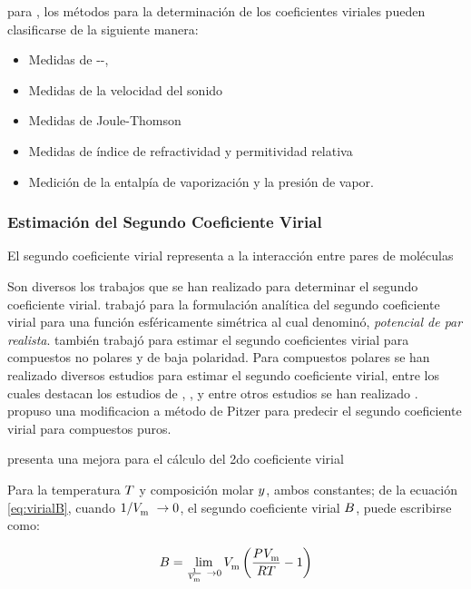     para \parencite{Dymond2002}, los métodos para la determinación de los coeficientes viriales pueden clasificarse de la siguiente manera:

    \begin{itemize}
      \item Medidas de {\pressure{}{}-\Vmolar-\T{}},
      \item Medidas de la velocidad del sonido
      \item Medidas de Joule-Thomson
      \item Medidas de índice de refractividad y permitividad relativa
      \item Medición de la entalpía de vaporización y la presión de vapor. 
    \end{itemize}

\subsubsection{Estimación del Segundo Coeficiente Virial}
  
    El segundo coeficiente virial representa a la interacción entre pares de moléculas

Son diversos los trabajos que se han realizado para determinar el segundo coeficiente virial. \autocite[postnote]{woolley1969second} trabajó para la formulación analítica del segundo coeficiente virial para una función esféricamente simétrica al cual denominó, \textit{potencial de par realista}. \parencite{pitzer1990second} también trabajó para estimar el segundo coeficientes virial para compuestos no polares y de baja polaridad. Para compuestos polares se han realizado diversos estudios para estimar el segundo coeficiente virial, entre los cuales destacan los estudios de \parencite{maris1985interaction}, \parencite{tarakad1977improved}, y entre otros estudios se han realizado . \parencite{vetere2007simple} propuso una modificacion a método de Pitzer para predecir el segundo coeficiente virial para compuestos puros.

\parencite{klotz1985improved} presenta una mejora para el cálculo del 2do coeficiente virial



Para la temperatura $T$ y composición molar ${y_{}}$, ambos constantes; de la ecuación \eqref{eq:virialB}, cuando $1 /  {V_{\text{m}}^{}} \ \to 0$,  el segundo coeficiente virial $B_{}$, puede escribirse como:

\begin{equation}
  B_{} = \lim_{\frac{1}{ {V_{\text{m}}^{}} }\ \to {0}}  {V_{\text{m}}^{}}  \left(\frac{P_{}^{}{}{}  {V_{\text{m}}^{}} } {R T} - 1 \right)
\end{equation}

